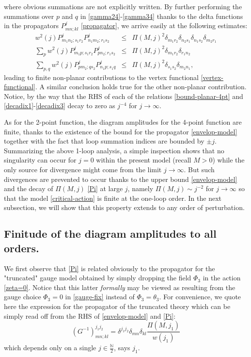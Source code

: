 \documentclass[a4paper,11pt,twoside]{article}
\numberwithin{equation}{section}
\theoremstyle{nonumberplain}
\newcounter{and}
\begin{document}
where obvious summations are not explicitly written. By further performing the summations over $p$ and $q$ in \eqref{gamma24}-\eqref{gamma34} thanks to the delta functions in the propagators $P^j_{mn;kl}$ \eqref{propagator}, we arrive easily at the following estimates:
\begin{eqnarray}
w^2(j)P^j_{m_1n_2;s_1r_2}P^j_{n_1m_2;r_1s_2}&\le&\Pi(M,j)^2\delta_{m_1r_2}\delta_{n_2s_1}\delta_{n_1s_2}\delta_{m_2r_1}\label{decadix1}\\
\sum_pw^2(j)P^j_{m_1p;s_1r_2}P^j_{pn_2;r_1s_2}&\le&\Pi(M,j)^2\delta_{m_1r_2}\delta_{r_1n_2}\label{decadix2}\\
\sum_{p,q}w^2(j)P^j_{pm_2;qs_2}P^j_{n_1p;s_1q}&\le&\Pi(M,j)^2\delta_{s_1s_2}\delta_{m_2n_1}\label{decadix3},
\end{eqnarray}
leading to finite non-planar contributions to the vertex functional \eqref{vertex-functional}. A similar conclusion holds true for the other non-planar contribution. Notice, by the way that the RHS of each of the relations \eqref{bound-planar-4pt} and \eqref{decadix1}-\eqref{decadix3} decay to zero as $j^{-4}$ for $j\to\infty$.\par

As for the 2-point function, the diagram amplitudes for the 4-point function are finite, thanks to the existence of the bound for the propagator \eqref{envelop-model} together with the fact that loop summation indices are bounded by $\pm j$. Summarizing the above 1-loop analysis, a simple inspection shows that no singularity can occur for $j=0$ within the present model (recall $M>0$) while the only source for divergence might come from the limit $j\to\infty$. But such divergences are prevented to occur thanks to the upper bound \eqref{envelop-model} and the decay of $\Pi(M,j)$ \eqref{Pi} at large $j$, namely $\Pi(M,j)\sim j^{-2}$ for $j\to\infty$ so that the model \eqref{critical-action} is finite at the one-loop order. In the next subsection, we will show that this property extends to any order of perturbation.

\subsection{Finitude of the diagram amplitudes to all orders.}\label{subsection33}

We first observe that \eqref{Pi} is related obviously to the propagator for the "truncated" gauge model obtained by simply dropping the field $\Phi_3$ in the action \eqref{zeta=0}. Notice that this latter {\it{formally}} may be viewed as resulting from the gauge choice $\Phi_3=0$ in \eqref{gauge-fix} instead of $\Phi_3=\theta_3$. For convenience, we quote here the expression for the propagator of the truncated theory which can be simply read off from the RHS of \eqref{envelop-model} and \eqref{Pi}:
\begin{equation}
(G^{-1})^{j_1j_2}_{mn;kl}=\delta^{j_1j_2}\delta_{mn}\delta_{kl}\frac{\Pi(M,j_1)}{w(j_1)}\label{g-1}
\end{equation}
which depends only on a single $j\in\frac{\mathbb{N}}{2}$, says $j_1$.\\
\end{document}
